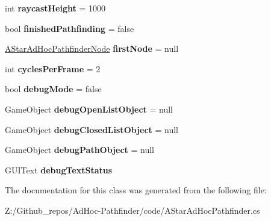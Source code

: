 \begin{DoxyCompactItemize}
\item 
\hypertarget{class_a_star_ad_hoc_pathfinder_a942bfa694d184dc2dd5a8cfbabc9e1e2}{int {\bfseries raycast\+Height} = 1000}\label{class_a_star_ad_hoc_pathfinder_a942bfa694d184dc2dd5a8cfbabc9e1e2}

\item 
\hypertarget{class_a_star_ad_hoc_pathfinder_ac0f41f95ca333743a366a10b971c0b95}{bool {\bfseries finished\+Pathfinding} = false}\label{class_a_star_ad_hoc_pathfinder_ac0f41f95ca333743a366a10b971c0b95}

\item 
\hypertarget{class_a_star_ad_hoc_pathfinder_a90ff1223c39ad8cab56e12a2b9af2d53}{\hyperlink{class_a_star_ad_hoc_pathfinder_node}{A\+Star\+Ad\+Hoc\+Pathfinder\+Node} {\bfseries first\+Node} = null}\label{class_a_star_ad_hoc_pathfinder_a90ff1223c39ad8cab56e12a2b9af2d53}

\item 
\hypertarget{class_a_star_ad_hoc_pathfinder_acce294950bb47098968b8810d5ab6458}{int {\bfseries cycles\+Per\+Frame} = 2}\label{class_a_star_ad_hoc_pathfinder_acce294950bb47098968b8810d5ab6458}

\item 
\hypertarget{class_a_star_ad_hoc_pathfinder_a295cf9cb0c092444d21af48574117f25}{bool {\bfseries debug\+Mode} = false}\label{class_a_star_ad_hoc_pathfinder_a295cf9cb0c092444d21af48574117f25}

\item 
\hypertarget{class_a_star_ad_hoc_pathfinder_a43bf5a9dc164a0f6efae2561ebf58faf}{Game\+Object {\bfseries debug\+Open\+List\+Object} = null}\label{class_a_star_ad_hoc_pathfinder_a43bf5a9dc164a0f6efae2561ebf58faf}

\item 
\hypertarget{class_a_star_ad_hoc_pathfinder_a27db7ab0f99553e9bb4c4c52e381a5a8}{Game\+Object {\bfseries debug\+Closed\+List\+Object} = null}\label{class_a_star_ad_hoc_pathfinder_a27db7ab0f99553e9bb4c4c52e381a5a8}

\item 
\hypertarget{class_a_star_ad_hoc_pathfinder_a51528372e4ef74eeadda1fb0a63acdf4}{Game\+Object {\bfseries debug\+Path\+Object} = null}\label{class_a_star_ad_hoc_pathfinder_a51528372e4ef74eeadda1fb0a63acdf4}

\item 
\hypertarget{class_a_star_ad_hoc_pathfinder_a0ad514d62484d2a5df20f640809ddfbd}{G\+U\+I\+Text {\bfseries debug\+Text\+Status}}\label{class_a_star_ad_hoc_pathfinder_a0ad514d62484d2a5df20f640809ddfbd}

\end{DoxyCompactItemize}


The documentation for this class was generated from the following file\+:\begin{DoxyCompactItemize}
\item 
Z\+:/\+Github\+\_\+repos/\+Ad\+Hoc-\/\+Pathfinder/code/A\+Star\+Ad\+Hoc\+Pathfinder.\+cs\end{DoxyCompactItemize}
